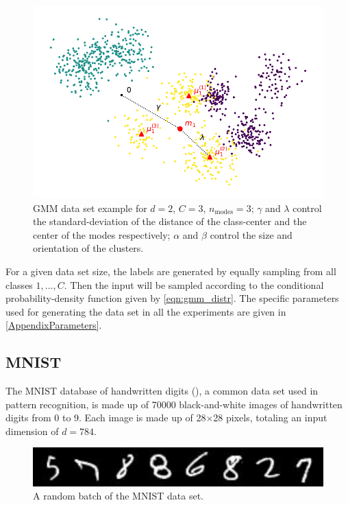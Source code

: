 \begin{figure}[h]
    \centering
    \includegraphics{figures/GMM_plot.pdf}
    \caption{GMM data set example for $d=2$, $C=3$, $n_\text{modes}=3$; 
    $\gamma$ and $\lambda$ control the standard-deviation of the distance of the class-center and the center of the modes respectively; $\alpha$ and $\beta$ control the size and orientation of the clusters.}
    \label{fig:GMM_plot}
\end{figure}

For a given data set size, the labels are generated by equally sampling from all classes $1, \ldots, C$.
Then the input will be sampled according to the conditional probability-density function given by \cref{eqn:gmm_distr}.
The specific parameters used for generating the data set in all the experiments
are given in \cref{AppendixParameters}.


\subsection{MNIST}
The MNIST database of handwritten digits (\cite{MNIST}), a common data set used in pattern recognition, is made up of 70000 black-and-white images 
of handwritten digits from 0 to 9. 
Each image is made up of 28$\times$28 pixels, totaling an input dimension of $d=784$.
\begin{figure}[h]
    \centering
    \includegraphics{figures/MNIST_plot.pdf}
    \caption{A random batch of the MNIST data set.}
    \label{fig:MNIST_plot}
\end{figure}

